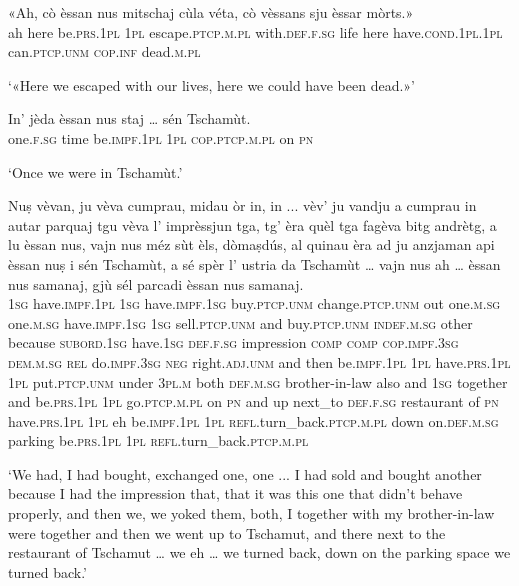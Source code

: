 \begin{linenumbers}
\gll «Ah, cò èssan nus mitschaj cùla véta, cò vèssans sju èssar mòrts.»\\
ah here be.\textsc{prs.1pl} \textsc{1pl} escape.\textsc{ptcp.m.pl} with.\textsc{def.f.sg} life here have.\textsc{cond.1pl.1pl} can.\textsc{ptcp.unm} \textsc{cop.inf} dead.\textsc{m.pl}\\
\end{linenumbers}
\medskip
\glt `«Here we escaped with our lives, here we could have been dead.»'
\medskip

\begin{linenumbers}
\gll   In’ jèda èssan nus staj … sén Tschamùt. \\
 one.\textsc{f.sg} time be.\textsc{impf.1pl} \textsc{1pl} \textsc{cop.ptcp.m.pl} {} on \textsc{pn} \\
\end{linenumbers}
\medskip
\glt `Once we were in Tschamùt.'
\medskip

\begin{linenumbers}
\gll Nuṣ vèvan, ju vèva cumprau, midau òr in, in ... vèv’ ju vandju a cumprau in autar parquaj tgu vèva l’ imprèssjun tga, tg’ èra quèl tga fagèva bitg andrètg, a lu èssan nus, vajn nus méz sùt èls, dòmaṣdús, al quinau èra ad ju anzjaman api èssan nuṣ i sén Tschamùt, a sé spèr l’ ustria da Tschamùt … vajn nus ah … èssan nus samanaj, gjù sél parcadi èssan nus samanaj.\\
 \textsc{1sg} have.\textsc{impf.1pl} \textsc{1sg} have.\textsc{impf.1sg} buy.\textsc{ptcp.unm} change.\textsc{ptcp.unm} out one.\textsc{m.sg} one.\textsc{m.sg} {} have.\textsc{impf.1sg} \textsc{1sg} sell.\textsc{ptcp.unm} and buy.\textsc{ptcp.unm} \textsc{indef.m.sg} other because \textsc{subord.1sg} have.\textsc{1sg} \textsc{def.f.sg} impression \textsc{comp} \textsc{comp} \textsc{cop.impf.3sg} \textsc{dem.m.sg} \textsc{rel} do.\textsc{impf.3sg} \textsc{neg} right.\textsc{adj.unm} and then be.\textsc{impf.1pl} \textsc{1pl} have.\textsc{prs.1pl}  \textsc{1pl} put.\textsc{ptcp.unm} under \textsc{3pl.m} both \textsc{def.m.sg} brother-in-law also and \textsc{1sg} together and be.\textsc{prs.1pl} \textsc{1pl} go.\textsc{ptcp.m.pl} on \textsc{pn} and up next\_to \textsc{def.f.sg} restaurant of \textsc{pn} {} have.\textsc{prs.1pl} \textsc{1pl} eh {} be.\textsc{impf.1pl} \textsc{1pl} \textsc{refl.}turn\_back.\textsc{ptcp.m.pl} down on.\textsc{def.m.sg} parking be.\textsc{prs.1pl} \textsc{1pl} \textsc{refl.}turn\_back.\textsc{ptcp.m.pl}\\
\end{linenumbers}
\medskip
\glt `We had, I had bought, exchanged one, one ... I had sold and bought another because I had the impression that, that it was this one that didn’t behave properly, and then we, we yoked them, both, I together with my brother-in-law were together and then we went up to Tschamut, and there next to the restaurant of Tschamut … we eh … we turned back, down on the parking space we turned back.'
\medskip

